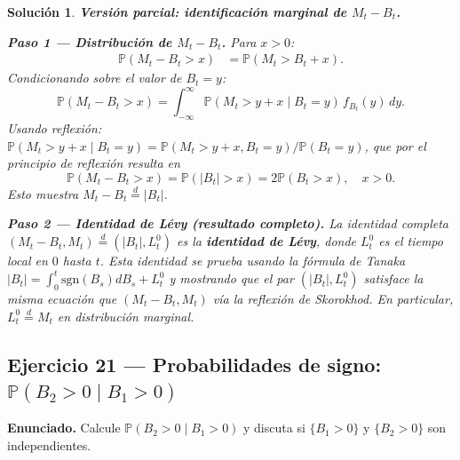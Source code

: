 \documentclass[12pt,letterpaper]{article}
\theoremstyle{ejercicio}
\theoremstyle{solucion}
\newtheorem*{solucion}{Solución}
\newcommand{\dto}{\overset{d}{=}}
\renewcommand{\P}{\mathbb{P}}
\begin{document}
\begin{solucion}

\textbf{Versión parcial: identificación marginal de $M_t-B_t$.}

\textbf{Paso 1 — Distribución de $M_t-B_t$.}
Para $x>0$:
\begin{align*}
  \P(M_t-B_t>x)
  &= \P(M_t>B_t+x).
\end{align*}
Condicionando sobre el valor de $B_t=y$:
\[
  \P(M_t-B_t>x) = \int_{-\infty}^\infty \P(M_t>y+x\mid B_t=y)\,f_{B_t}(y)\,dy.
\]
Usando reflexión: $\P(M_t>y+x\mid B_t=y)=\P(M_t>y+x,B_t=y)/\P(B_t=y)$, que por el
principio de reflexión resulta en
\[
  \P(M_t-B_t>x)=\P(|B_t|>x)=2\P(B_t>x),\quad x>0.
\]
Esto muestra $M_t-B_t\dto|B_t|$.

\textbf{Paso 2 — Identidad de Lévy (resultado completo).}
La identidad completa $(M_t-B_t,M_t)\dto(|B_t|,L^0_t)$ es la \textbf{identidad de Lévy},
donde $L^0_t$ es el tiempo local en $0$ hasta $t$. Esta identidad se prueba usando la
fórmula de Tanaka $|B_t|=\int_0^t\text{sgn}(B_s)dB_s+L^0_t$ y mostrando que el par
$(|B_t|,L^0_t)$ satisface la misma ecuación que $(M_t-B_t,M_t)$ vía la reflexión de Skorokhod.
En particular, $L^0_t\dto M_t$ en distribución marginal.
\end{solucion}

\subsection*{Ejercicio 21 — Probabilidades de signo: $\P(B_2>0\mid B_1>0)$}

\begin{recuadro}
\textbf{Enunciado.} Calcule $\P(B_2>0\mid B_1>0)$ y discuta si $\{B_1>0\}$ y
$\{B_2>0\}$ son independientes.
\end{recuadro}
\end{document}
